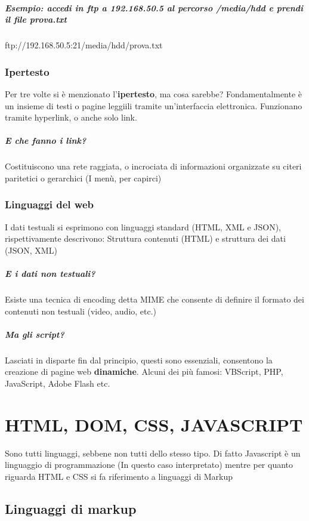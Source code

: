\documentclass[12pt, a4paper, openany, twoside]{book}
\begin{document}
\paragraph{Esempio: accedi in ftp a 192.168.50.5 al percorso /media/hdd e 
prendi il file prova.txt} ftp://192.168.50.5:21/media/hdd/prova.txt
\subsection{Ipertesto}
Per tre volte si è menzionato l'\textbf{ipertesto}, ma cosa sarebbe? Fondamentalmente
è un insieme di testi o pagine leggiili tramite un'interfaccia elettronica. 
Funzionano tramite hyperlink, o anche solo link.
\paragraph{E che fanno i link?} Costituiscono una rete raggiata, o incrociata di
informazioni organizzate su citeri paritetici o gerarchici (I menù, per capirci)
\subsection{Linguaggi del web}
I dati testuali si esprimono con linguaggi standard (HTML, XML e JSON),
rispettivamente descrivono: Struttura contenuti (HTML) e struttura dei dati (JSON, XML)
\paragraph{E i dati non testuali?} Esiste una tecnica di encoding detta MIME che
consente di definire il formato dei contenuti non testuali (video, audio, etc.)
\paragraph{Ma gli script?} Lasciati in disparte fin dal principio, questi 
sono essenziali, consentono la creazione di pagine web \textbf{dinamiche}.
Alcuni dei più famosi: VBScript, PHP, JavaScript, Adobe Flash etc.
\chapter{HTML, DOM, CSS, JAVASCRIPT}
Sono tutti linguaggi, sebbene non tutti dello stesso tipo. Di fatto Javascript è
un linguaggio di programmazione (In questo caso interpretato) mentre per quanto
riguarda HTML e CSS si fa riferimento a linguaggi di Markup
\section{Linguaggi di markup}
\end{document}
